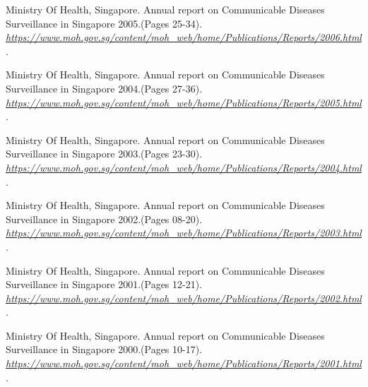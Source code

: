 \documentclass[11pt]{exam}
\begin{document}
\begin{thebibliography}{28}
Ministry Of Health, Singapore. Annual report on Communicable Diseases Surveillance in Singapore 2005.(Pages 25-34).
\textit{\url{https://www.moh.gov.sg/content/moh_web/home/Publications/Reports/2006.html}}.

Ministry Of Health, Singapore. Annual report on Communicable Diseases Surveillance in Singapore 2004.(Pages 27-36).
\textit{\url{https://www.moh.gov.sg/content/moh_web/home/Publications/Reports/2005.html}}.

Ministry Of Health, Singapore. Annual report on Communicable Diseases Surveillance in Singapore 2003.(Pages 23-30).
\textit{\url{https://www.moh.gov.sg/content/moh_web/home/Publications/Reports/2004.html}}.

Ministry Of Health, Singapore. Annual report on Communicable Diseases Surveillance in Singapore 2002.(Pages 08-20).
\textit{\url{https://www.moh.gov.sg/content/moh_web/home/Publications/Reports/2003.html}}.

Ministry Of Health, Singapore. Annual report on Communicable Diseases Surveillance in Singapore 2001.(Pages 12-21).
\textit{\url{https://www.moh.gov.sg/content/moh_web/home/Publications/Reports/2002.html}}.

Ministry Of Health, Singapore. Annual report on Communicable Diseases Surveillance in Singapore 2000.(Pages 10-17).
\textit{\url{https://www.moh.gov.sg/content/moh_web/home/Publications/Reports/2001.html}}.


\end{thebibliography}
\end{document}
